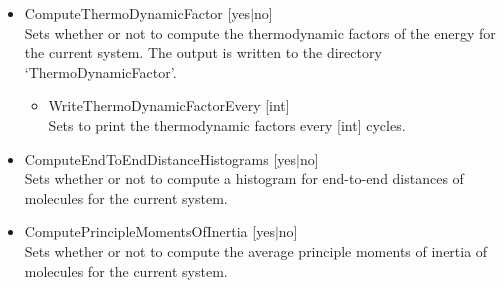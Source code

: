 \begin{itemize}
\item{ComputeThermoDynamicFactor [yes$|$no]}\\
Sets whether or not to compute the thermodynamic factors of the energy for the current system. 
The output is written to the directory `ThermoDynamicFactor'.
\begin{itemize}
\item{WriteThermoDynamicFactorEvery [int]}\\
Sets to print the thermodynamic factors every [int] cycles.
\end{itemize}

\item{ComputeEndToEndDistanceHistograms [yes$|$no]}\\
Sets whether or not to compute a histogram for end-to-end distances of molecules for the current system.

\item{ComputePrincipleMomentsOfInertia [yes$|$no]}\\
Sets whether or not to compute the average principle moments of inertia of molecules for the current system.


\end{itemize}
